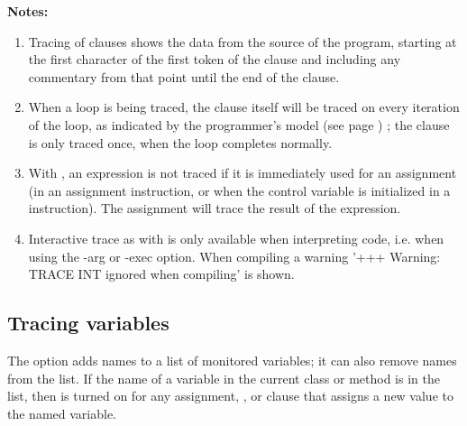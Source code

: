  \textbf{Notes:}
\begin{enumerate}
\item Tracing of clauses shows the data from the source of the program,
starting at the first character of the first token of the clause and
including any commentary from that point until the end of the clause.
\item When a loop is being traced, the  clause itself will be
traced on every iteration of the loop, as indicated by the
 programmer's model (see page \pageref{refloopmod}) ; the  clause is only
traced once, when the loop completes normally.
\item With , an expression is not traced if it is
immediately used for an assignment (in an assignment instruction, or
when the control variable is initialized in a 
instruction).
The assignment will trace the result of the expression.
\item Interactive trace as with  is only available when 
interpreting code, i.e. when using the -arg or -exec option. When compiling
 a warning '+++ Warning: TRACE INT ignored when compiling' is shown.
\end{enumerate}
\subsection{Tracing variables}
 
The  option adds names to a list of monitored
variables; it can also remove names from the list.  If the name of a
variable in the current class or method is in the list, then  is turned on for any assignment, , or
 clause that assigns a new value to the named
variable.
 
